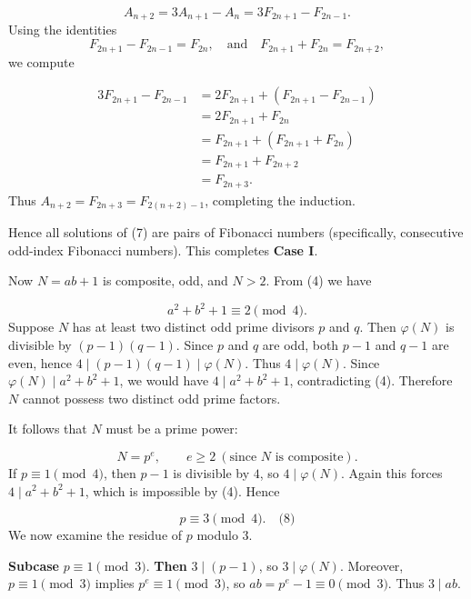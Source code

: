 \[
A_{n+2} = 3A_{n+1} - A_n = 3F_{2n+1} - F_{2n-1}.
\]
Using the identities
\[
F_{2n+1} - F_{2n-1} = F_{2n},\quad \text{and}\quad F_{2n+1} + F_{2n} = F_{2n+2},
\]
we compute\par
\[
\begin{aligned}
3F_{2n+1} - F_{2n-1} &= 2F_{2n+1} + (F_{2n+1} - F_{2n-1}) \\
&= 2F_{2n+1} + F_{2n} \\
&= F_{2n+1} + (F_{2n+1} + F_{2n}) \\
&= F_{2n+1} + F_{2n+2} \\
&= F_{2n+3}.
\end{aligned}
\]
Thus \(A_{n+2} = F_{2n+3} = F_{2(n+2)-1}\), completing the induction.\par
Hence all solutions of (7) are pairs of Fibonacci numbers (specifically, consecutive odd-index Fibonacci numbers). This completes \textbf{Case I}.\par
\smallskip
{}
Now \(N = ab+1\) is composite, odd, and \(N>2\). From (4) we have\par
\[
a^{2}+b^{2}+1 \equiv 2 \pmod{4}.
\]
Suppose \(N\) has at least two distinct odd prime divisors \(p\) and \(q\). Then \(\varphi(N)\) is divisible by \((p-1)(q-1)\). Since \(p\) and \(q\) are odd, both \(p-1\) and \(q-1\) are even, hence \(4 \mid (p-1)(q-1) \mid \varphi(N)\). Thus \(4 \mid \varphi(N)\). Since \(\varphi(N) \mid a^{2}+b^{2}+1\), we would have \(4 \mid a^{2}+b^{2}+1\), contradicting (4). Therefore \(N\) cannot possess two distinct odd prime factors.\par
It follows that \(N\) must be a prime power:\par
\[
N = p^{e}, \qquad e \ge 2\ (\text{since } N \text{ is composite}).
\]
If \(p \equiv 1 \pmod{4}\), then \(p-1\) is divisible by \(4\), so \(4 \mid \varphi(N)\). Again this forces \(4 \mid a^{2}+b^{2}+1\), which is impossible by (4). Hence\par
\[
p \equiv 3 \pmod{4}. \quad\text{(8)}
\]
We now examine the residue of \(p\) modulo \(3\).\par
\textbf{Subcase }\(p \equiv 1 \pmod{3}\).\textbf{ Then }\(3 \mid (p-1)\), so \(3 \mid \varphi(N)\). Moreover, \(p \equiv 1 \pmod{3}\) implies \(p^{e} \equiv 1 \pmod{3}\), so \(ab = p^{e} - 1 \equiv 0 \pmod{3}\). Thus \(3 \mid ab\).\par

